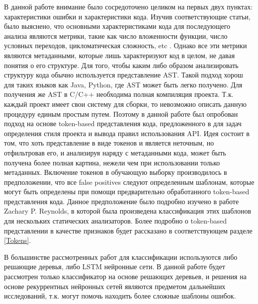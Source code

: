 В данной работе внимание было сосредоточено целиком на первых двух пунктах: характеристики ошибки и характеристики кода. Изучив соответствующие статьи, было выяснено, что основными характеристиками кода для последующего анализа являются метрики, такие как число вложенности функции, число условных переходов, цикломатическая сложность, etc \cite{test-suites-for-dataset}. Однако все эти метрики являются метаданными, которые лишь характеризуют код в целом, не давая понятия о его структуре. Для того, чтобы каким либо образом анализировать структуру кода обычно используется представление AST\cite{Shedko2020ApplyingPM}. Такой подход хорош для таких языков как Java, Python, где AST может быть легко получено. Для получения же AST в C/C++ необходима полная компиляция проекта. Т.к. каждый проект имеет свои систему для сборки, то невозможно описать данную процедуру единым простым путем. Поэтому в данной работе был опробован подход на основе token-based представления кода, предложенного в \cite{Shedko2020ApplyingPM} для задач определения стиля проекта и вывода правил использования API. Идея состоит в том, что хоть представление в виде токенов и является неточным, но отфильтровав его, и анализируя наряду с метаданными кода, может быть получена более полная картина, нежели чем при использовании только метаданных. Включение токенов в обучающую выборку производилось в предположении, что все false positives следуют определенным шаблонам, которые могут быть определены при помощи предварительно обработанного token-based представления кода. Данное предположение было подробно изучено в работе Zachary P. Reynolds\cite{Reynolds}, в которой была произведена классификация этих шаблонов для нескольких статических анализаторов. Более подробно о token-based представлении в качестве признаков будет рассказано в соответствующем разделе \ref{Tokens}.

В большинстве рассмотренных работ для классификации используются либо решающие деревья, либо LSTM нейронные сети\cite{test-suites-for-dataset, assesing-validity-of-sa-warnings-cisco}. В данной работе будет рассмотрен только классификатор на основе решающих деревьев, и решения на основе рекуррентных нейронных сетей являются предметом дальнейших исследований, т.к. могут помочь находить более сложные шаблоны ошибок.

